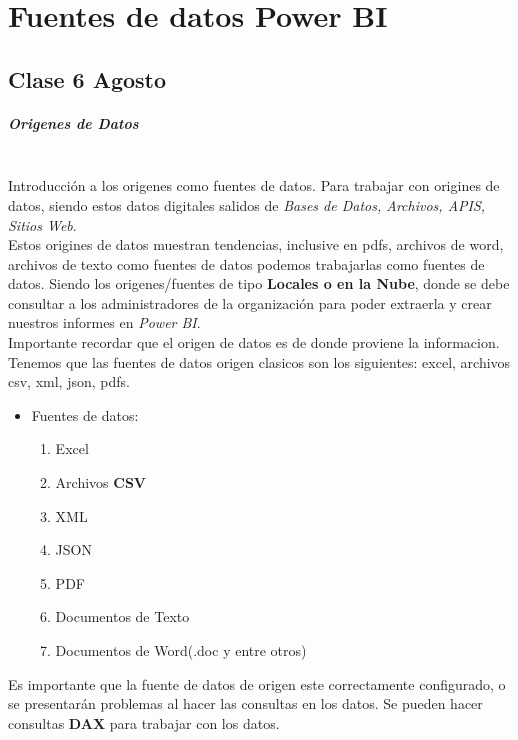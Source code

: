 \documentclass[a4paper]{report} %
\begin{document}
      \chapter{Fuentes de datos Power BI}
        \section{Clase 6 Agosto}
          \paragraph{Origenes de Datos}\mbox{} \\
            Introducción a los origenes como fuentes de datos. Para trabajar con origines de datos, siendo estos datos digitales salidos de \textit{Bases de Datos, Archivos, APIS, Sitios Web}.
            \\Estos origines de datos muestran tendencias, inclusive en pdfs, archivos de word, archivos de texto como fuentes de datos podemos trabajarlas como fuentes de datos. Siendo los origenes/fuentes de tipo \textbf{Locales o en la Nube}, donde se debe consultar a los administradores de la organización para poder extraerla y crear nuestros informes en \textit{Power BI}.
            \\Importante recordar que el origen de datos es de donde proviene la informacion.
            \\Tenemos que las fuentes de datos origen clasicos son los siguientes: excel, archivos csv, xml, json, pdfs.
            \begin{itemize}
              \item Fuentes de datos:
                \begin{enumerate}
                  \item Excel
                  \item Archivos \textbf{CSV}
                  \item XML
                  \item JSON
                  \item PDF
                  \item Documentos de Texto
                  \item Documentos de Word(.doc y entre otros)
                \end{enumerate}
            \end{itemize}
            Es importante que la fuente de datos de origen este correctamente configurado, o se presentarán problemas al hacer las consultas en los datos. Se pueden hacer consultas \textbf{DAX} para trabajar con los datos.
\end{document}
